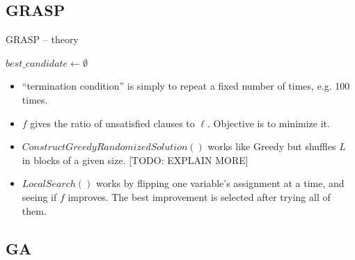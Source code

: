 \documentclass[aspectratio=169, compress, xcolor=table,xcolor=dvipsnames]{beamer}
\begin{document}
\subsection{GRASP}

\begin{frame}
{GRASP -- theory}

\begin{algorithmic}[1]\sffamily
	\State $best\_candidate\gets \emptyset$
	\EndIf
	\EndWhile
	\State{}
\end{algorithmic}

\vfill

\begin{itemize}
	\item ``termination condition'' is simply to repeat a fixed number of times, e.g. 100 times.
	\item $f$ gives the ratio of unsatisfied clauses to $\ell$. Objective is to minimize it.
	\item $ConstructGreedyRandomizedSolution()$ works like Greedy but shuffles $L$ in blocks of a given size. [TODO: EXPLAIN MORE]
	\item $LocalSearch()$ works by flipping one variable's assignment at a time, and seeing if $f$ improves. The best improvement is selected after trying all of them. \cite{greedy}
\end{itemize}
\end{frame}%

%
%

%
%
%
%

\subsection{GA}
\end{document}
